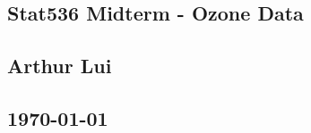 \documentclass{article}                                                   %
\begin{document}
\begin{center}                                                            %
  \section*{\textbf{Stat536 Midterm - Ozone Data}}                        %
  \subsection*{\textbf{Arthur Lui}}                                       %
  \subsection*{\noindent\today}                                           %
\end{center}                                                              %
\end{document}

